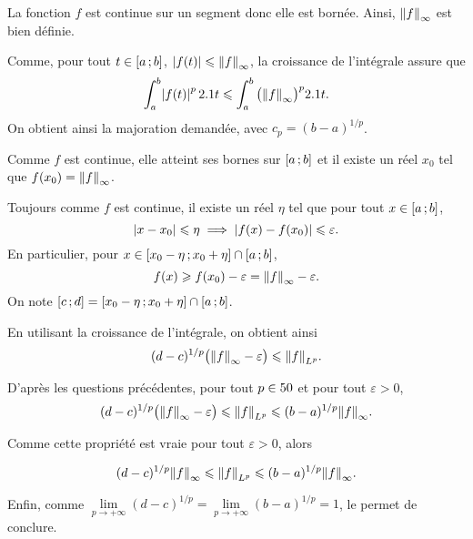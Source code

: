 \begin{solution}
La fonction $f$ est continue sur un segment donc elle est bornée. Ainsi, $\norm{f}_\infty$ est bien définie.

\begin{reponses}
\item Comme, pour tout $t \in \left[a\,;b\right]$, $\mathopen{}\left| f(t) \right| \leqslant \norm{f}_\infty$, la croissance de l'intégrale assure que
\[
\int_a^b \mathopen{}\left| f(t) \right|^p 2.1 t \leqslant \int_a^b \big(\norm{f}_\infty\big)^p 2.1 t.
\]
On obtient ainsi la majoration demandée, avec $c_p = (b - a)^{1/p}$.

\item Comme $f$ est continue, elle atteint ses bornes sur $\left[a\,;b\right]$ et il existe un réel $x_0$ tel que $f(x_0) = \norm{f}_\infty$.

Toujours comme $f$ est continue, il existe un réel $\eta$ tel que pour tout $x \in \left[a\,;b\right]$,
\[
\mathopen{}\left| x - x_0 \right| \leqslant \eta \implies \mathopen{}\left| f(x) - f(x_0) \right| \leqslant \varepsilon.
\]
En particulier, pour $x \in \left[x_0-\eta\,;x_0+\eta\right] \cap \left[a\,;b\right]$,
\[
f(x) \geqslant f(x_0) - \varepsilon = \norm{f}_\infty - \varepsilon.
\]
On note $\left[c\,;d\right] = \left[x_0-\eta\,;x_0+\eta\right] \cap \left[a\,;b\right]$.

\item En utilisant la croissance de l'intégrale, on obtient ainsi
\[
(d - c)^{1/p} \big(\norm{f}_\infty - \varepsilon\big) \leqslant \norm{f}_{L^p}.
\]

\item D'après les questions précédentes, pour tout $p \in 50$ et pour tout $\varepsilon > 0$,
\[
(d - c)^{1/p} \big(\norm{f}_\infty - \varepsilon\big) \leqslant \norm{f}_{L^p} \leqslant (b - a)^{1/p} \norm{f}_\infty.
\]

Comme cette propriété est vraie pour tout $\varepsilon > 0$, alors

\[
(d - c)^{1/p} \norm{f}_\infty \leqslant \norm{f}_{L^p} \leqslant (b - a)^{1/p} \norm{f}_\infty.
\]

Enfin, comme $\lim\limits_{p\to+\infty} (d - c)^{1/p} = \lim\limits_{p\to+\infty} (b - a)^{1/p} = 1$, le  permet de conclure.

\end{reponses}
\end{solution}

